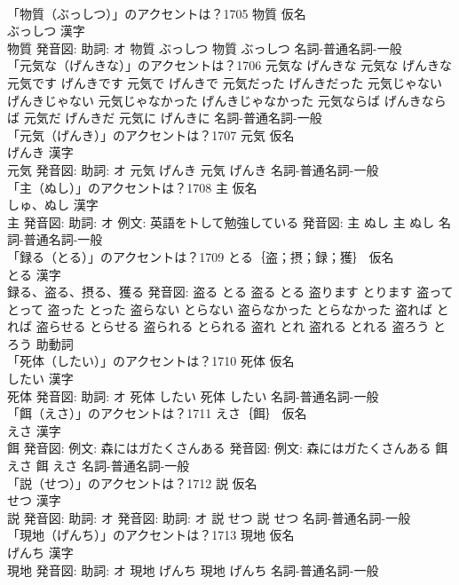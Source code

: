 \documentclass[8pt]{extreport}
\begin{document}
\begin{CJK}{UTF8}{min}
\\	「物質（ぶっしつ）」のアクセントは？1705	物質 仮名　
\\	ぶっしつ 漢字　
\\	物質 発音図: 助詞: オ	物質 ぶっしつ		物質 ぶっしつ				名詞-普通名詞-一般 
\\	「元気な（げんきな）」のアクセントは？1706		元気な げんきな		元気な げんきな 元気です げんきです 元気で げんきで 元気だった げんきだった 元気じゃない げんきじゃない 元気じゃなかった げんきじゃなかった 元気ならば げんきならば 元気だ げんきだ 元気に げんきに				名詞-普通名詞-一般 
\\	「元気（げんき）」のアクセントは？1707	元気 仮名　
\\	げんき 漢字　
\\	元気 発音図: 助詞: オ	元気 げんき		元気 げんき				名詞-普通名詞-一般 
\\	「主（ぬし）」のアクセントは？1708	主 仮名　
\\	しゅ、ぬし 漢字　
\\	主 発音図: 助詞: オ 例文: 英語をトして勉強している 発音図:	主 ぬし		主 ぬし				名詞-普通名詞-一般 
\\	「録る（とる）」のアクセントは？1709	とる｛盗；摂；録；獲｝ 仮名　
\\	とる 漢字　
\\	録る、盗る、摂る、獲る 発音図:	盗る とる		盗る とる 盗ります とります 盗って とって 盗った とった 盗らない とらない 盗らなかった とらなかった 盗れば とれば 盗らせる とらせる 盗られる とられる 盗れ とれ 盗れる とれる 盗ろう とろう				助動詞 
\\	「死体（したい）」のアクセントは？1710	死体 仮名　
\\	したい 漢字　
\\	死体 発音図: 助詞: オ	死体 したい		死体 したい				名詞-普通名詞-一般 
\\	「餌（えさ）」のアクセントは？1711	えさ｛餌｝ 仮名　
\\	えさ 漢字　
\\	餌 発音図: 例文: 森にはガたくさんある 発音図: 例文: 森にはガたくさんある	餌 えさ		餌 えさ				名詞-普通名詞-一般 
\\	「説（せつ）」のアクセントは？1712	説 仮名　
\\	せつ 漢字　
\\	説 発音図: 助詞: オ 発音図: 助詞: オ	説 せつ		説 せつ				名詞-普通名詞-一般 
\\	「現地（げんち）」のアクセントは？1713	現地 仮名　
\\	げんち 漢字　
\\	現地 発音図: 助詞: オ	現地 げんち		現地 げんち				名詞-普通名詞-一般 

\end{CJK}
\end{document}
